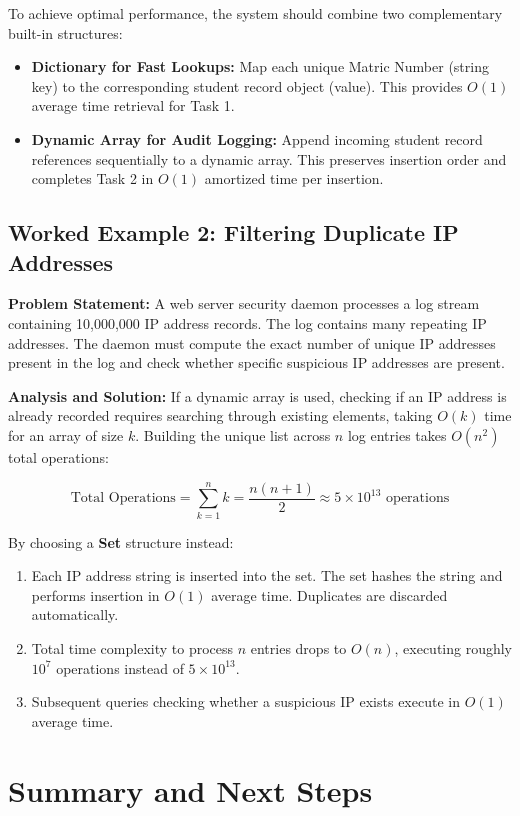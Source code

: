 \documentclass[12pt]{report}
\begin{document}
To achieve optimal performance, the system should combine two complementary built-in structures:
\begin{itemize}
    \item \textbf{Dictionary for Fast Lookups:} Map each unique Matric Number (string key) to the corresponding student record object (value). This provides $O(1)$ average time retrieval for Task 1.
    \item \textbf{Dynamic Array for Audit Logging:} Append incoming student record references sequentially to a dynamic array. This preserves insertion order and completes Task 2 in $O(1)$ amortized time per insertion.
\end{itemize}

\subsection{Worked Example 2: Filtering Duplicate IP Addresses}

\textbf{Problem Statement:} A web server security daemon processes a log stream containing 10,000,000 IP address records. The log contains many repeating IP addresses. The daemon must compute the exact number of unique IP addresses present in the log and check whether specific suspicious IP addresses are present.

\textbf{Analysis and Solution:}
If a dynamic array is used, checking if an IP address is already recorded requires searching through existing elements, taking $O(k)$ time for an array of size $k$. Building the unique list across $n$ log entries takes $O(n^2)$ total operations:

\[
\text{Total Operations} = \sum_{k=1}^{n} k = \frac{n(n + 1)}{2} \approx 5 \times 10^{13} \text{ operations}
\]

By choosing a \textbf{Set} structure instead:
\begin{enumerate}
    \item Each IP address string is inserted into the set. The set hashes the string and performs insertion in $O(1)$ average time. Duplicates are discarded automatically.
    \item Total time complexity to process $n$ entries drops to $O(n)$, executing roughly $10^7$ operations instead of $5 \times 10^{13}$.
    \item Subsequent queries checking whether a suspicious IP exists execute in $O(1)$ average time.
\end{enumerate}

\section{Summary and Next Steps}
\end{document}
